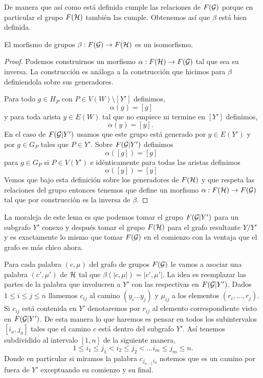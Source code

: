 \documentclass[tesis.tex]{subfiles}
\begin{document}
De manera que así como está definida cumple las relaciones de $F({\cal G})$ porque en particular el grupo $F({\cal H})$ también las cumple.
Obtenemos así que $\beta$ está bien definida.

\begin{lema}
	El morfismo de grupos $\beta:F({\cal G}) \to F({\cal H})$ es un isomorfismo. 
\end{lema}
\begin{proof}
	Podemos construirnos un morfismo $\alpha:F({\cal H}) \to F({\cal G})$ tal que sea su inversa.
	La construcción es análoga a la construcción que hicimos para $\beta$ definiendola sobre sus generadores.
	
	Para todo $g \in H_P$ con $P \in V(W) \setminus [Y'] $ definimos,
	\begin{equation*}
		\alpha(g) = [g]  \ \ 
	\end{equation*}
	y para toda arista $ y \in E(W)$ tal que no empiece ni termine en $[Y']$ definimos,
	\begin{equation*}
		\alpha(y) = [y].  \ \ \ 
	\end{equation*}
	En el caso de $F({\cal G} | Y')$ usamos que este grupo está generado por $y \in E(Y')$ y por $g \in G_{P}$ tales que $P \in Y'$.
	Sobre $F({\cal G} | Y')$ definimos 
	\begin{equation*}
		\alpha([g]) = [g]  \ \ 
	\end{equation*}
	para $g \in G_P$ si $P \in V(Y')$ e idénticamente para todas las aristas definimos
	\begin{equation*}
		\alpha([y]) = [y]  \ \ 
	\end{equation*}
	Vemos que bajo esta definición sobre los generadores de $F({\cal H})$ y que respeta las relaciones del grupo entonces tenemos que define un morfismo $\alpha:F({\cal H}) \to F({\cal G})$ tal que por construcción es la inversa de $\beta$.
\end{proof}

La moraleja de este lema es que podemos tomar el grupo $F({\cal G} | Y')$ para un subgrafo $Y'$ conexo y después tomar el grupo $F({\cal H})$ para el grafo resultante $Y / Y'$ y es exactamente lo mismo que tomar $F({\cal G})$ en el comienzo con la ventaja que el grafo es más chico ahora.

Para cada palabra $(c, \mu)$ del grafo de grupos $F({\cal G})$ le vamos a asociar una palabra $(c', \mu')$ de ${\cal H}$ tal que $\beta (|c,\mu|) = |c',\mu'|$.
La idea es reemplazar las partes de la palabra que involucren a $Y'$ con las respectivas en $F({\cal G} | Y')$.
Dados $ 1 \le i \le j \le n$ llamemos $c_{ij}$ al camino 
$(y_i \dots y_{j})$ y $\mu_{ij}$ a los elementos $(r_i, \dots, r_j)$.
Si $c_{ij}$ está contenida en $Y'$ denotaremos por $r_{ij}$ al elemento correspondiente visto en $F({\cal G} | Y')$.
De esta manera lo que haremos es pensar en todos los subintervalos $[i_a,j_a]$  tales que el camino $c$ está dentro del subgrafo $Y'$.
Así tenemos subdividido al intervalo $[1,n]$ de la siguiente manera,
\[
	1\le i_1 \le j_1 < i_2 \le j_2 < \dots i_m \le j_m \le n.
\]
Donde en particular si miramos la palabra $c_{j_{a-1}i_a}$ notemos que es un camino por fuera de $Y'$ exceptuando su comienzo y su final.
\end{document}
